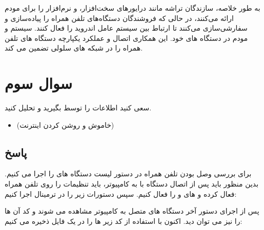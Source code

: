 \documentclass[landscape, 12pt]{report}
\begin{document}
به طور خلاصه، سازندگان تراشه مانند درایورهای سخت‌افزار، 
 و نرم‌افزار را برای مودم ارائه می‌کنند، در حالی که فروشندگان دستگاه‌های تلفن همراه
   را پیاده‌سازی و سفارشی‌سازی می‌کنند تا ارتباط بین سیستم عامل اندروید را فعال کنند. سیستم و مودم در دستگاه های خود. این همکاری اتصال و عملکرد یکپارچه دستگاه های تلفن همراه را در شبکه های سلولی تضمین می کند.

\section*{سوال سوم}
سعی کنید اطلاعات
 را توسط
 بگیرید و تحلیل کنید.
\begin{itemize}
	\item 
	 (خاموش و روشن کردن اینترنت)
\end{itemize}
\subsection*{پاسخ}
برای بررسی وصل بودن تلفن همراه در 
دستور لیست دستگاه های
را اجرا می کنیم. بدین منظور باید پس از اتصال دستگاه با 
به کامپیوتر، باید تنظیمات 
را روی تلفن همراه فعال کرده و 
های 
و 
را فعال کنیم. سپس دستورات زیر را در ترمینال اجرا کنیم:
\begin{latin}
	
	\label{code:DeverloperCommands}
\end{latin}
پس از اجرای دستور آخر دستگاه های متصل به کامپیوتر مشاهده می شوند و کد آن ها را نیز می توان دید.
اکنون با استفاده از کد زیر 
ها را در یک فایل 
ذخیره می کنیم:
\begin{latin}
	
	\label{code:LogPrinter}
\end{latin}
\end{document}
